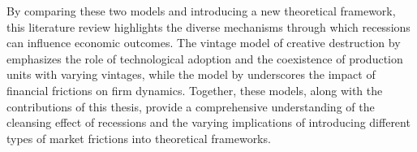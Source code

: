 By comparing these two models and introducing a new theoretical framework, this literature review highlights the diverse
mechanisms through which recessions can influence economic outcomes. The vintage model of creative destruction by
\cite{CabHarm94} emphasizes the role of technological adoption and the coexistence of production units with varying
vintages, while the model by \cite{OsePap17} underscores the impact of financial frictions on firm dynamics. Together,
these models, along with the contributions of this thesis, provide a comprehensive understanding of the cleansing effect
of recessions and the varying implications of introducing different types of market frictions into theoretical
frameworks.
